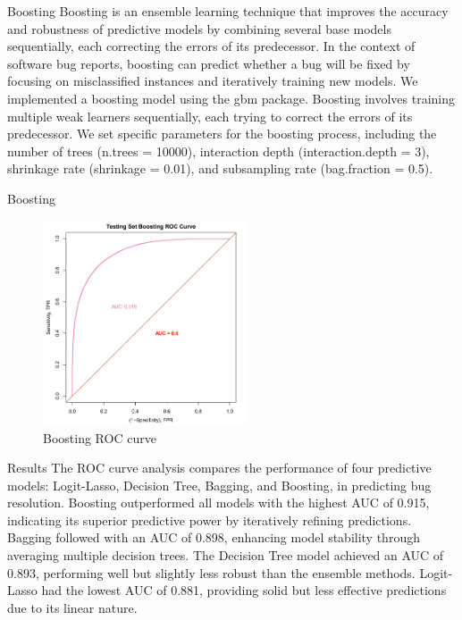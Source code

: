 \documentclass[10pt]{beamer}
\begin{document}
\begin{frame}[t]{Boosting}\justifying \vspace{10pt}
	Boosting is an ensemble learning technique that improves the accuracy and robustness of predictive models by combining several base models sequentially, each correcting the errors of its predecessor. In the context of software bug reports, boosting can predict whether a bug will be fixed by focusing on misclassified instances and iteratively training new models. 
	\vskip 8pt
	We implemented a boosting model using the gbm package. Boosting involves training multiple weak learners sequentially, each trying to correct the errors of its predecessor. We set specific parameters for the boosting process, including the number of trees (n.trees = 10000), interaction depth (interaction.depth = 3), shrinkage rate (shrinkage = 0.01), and subsampling rate (bag.fraction = 0.5).
\end{frame}

\begin{frame}[t]{Boosting}\justifying \vspace{0pt}
	\begin{figure}[htp]
		\centering
		\includegraphics[width=0.54\textwidth]{./Boosting_ROC.jpg}
		\caption{Boosting ROC curve}
		\label{fig:picture1}
	\end{figure}
\end{frame}


\begin{frame}[t]{Results}\justifying \vspace{10pt}
The ROC curve analysis compares the performance of four predictive models: Logit-Lasso, Decision Tree, Bagging, and Boosting, in predicting bug resolution. Boosting outperformed all models with the highest AUC of 0.915, indicating its superior predictive power by iteratively refining predictions. Bagging followed with an AUC of 0.898, enhancing model stability through averaging multiple decision trees. The Decision Tree model achieved an AUC of 0.893, performing well but slightly less robust than the ensemble methods. Logit-Lasso had the lowest AUC of 0.881, providing solid but less effective predictions due to its linear nature. 
\end{frame}
\end{document}
